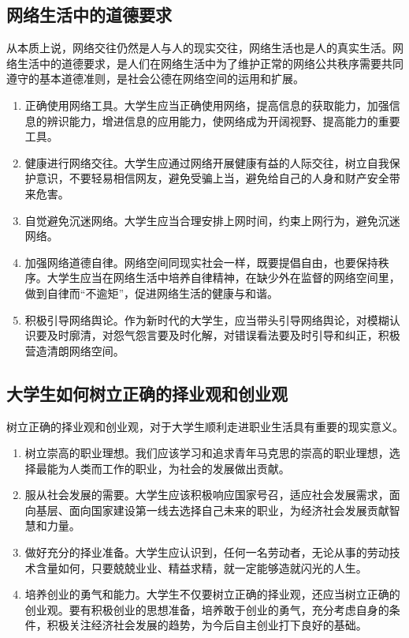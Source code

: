 \subsection{网络生活中的道德要求}
从本质上说，网络交往仍然是人与人的现实交往，网络生活也是人的真实生活。网络生活中的道德要求，是人们在网络生活中为了维护正常的网络公共秩序需要共同遵守的基本道德准则，是社会公德在网络空间的运用和扩展。
\begin{enumerate}
\item 正确使用网络工具。大学生应当正确使用网络，提高信息的获取能力，加强信息的辨识能力，增进信息的应用能力，使网络成为开阔视野、提高能力的重要工具。
\item 健康进行网络交往。大学生应通过网络开展健康有益的人际交往，树立自我保护意识，不要轻易相信网友，避免受骗上当，避免给自己的人身和财产安全带来危害。
\item 自觉避免沉迷网络。大学生应当合理安排上网时间，约束上网行为，避免沉迷网络。
\item 加强网络道德自律。网络空间同现实社会一样，既要提倡自由，也要保持秩序。大学生应当在网络生活中培养自律精神，在缺少外在监督的网络空间里，做到自律而“不逾矩”，促进网络生活的健康与和谐。
\item 积极引导网络舆论。作为新时代的大学生，应当带头引导网络舆论，对模糊认识要及时廓清，对怨气怨言要及时化解，对错误看法要及时引导和纠正，积极营造清朗网络空间。
\end{enumerate}

\subsection{大学生如何树立正确的择业观和创业观}
树立正确的择业观和创业观，对于大学生顺利走进职业生活具有重要的现实意义。
\begin{enumerate}
\item 树立崇高的职业理想。我们应该学习和追求青年马克思的崇高的职业理想，选择最能为人类而工作的职业，为社会的发展做出贡献。
\item 服从社会发展的需要。大学生应该积极响应国家号召，适应社会发展需求，面向基层、面向国家建设第一线去选择自己未来的职业，为经济社会发展贡献智慧和力量。
\item 做好充分的择业准备。大学生应认识到，任何一名劳动者，无论从事的劳动技术含量如何，只要兢兢业业、精益求精，就一定能够造就闪光的人生。
\item 培养创业的勇气和能力。大学生不仅要树立正确的择业观，还应当树立正确的创业观。要有积极创业的思想准备，培养敢于创业的勇气，充分考虑自身的条件，积极关注经济社会发展的趋势，为今后自主创业打下良好的基础。
\end{enumerate}

